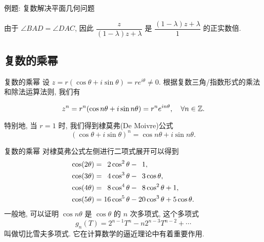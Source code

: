 \begin{frame}{例题: 复数解决平面几何问题}
	\onslide<+->
	\begin{proofc}
		由于 $\angle BAD=\angle DAC$, 因此 $\dfrac{z}{(1-\lambda)z+\lambda}$ 是 $\dfrac{(1-\lambda)z+\lambda}{1}$ 的正实数倍.
		\onslide<+->{
			显然 $z\neq \ov z$. 又因为 $0<\lambda<1$, 故
			\[\frac{AB}{AC}=|z|=\frac{\lambda}{1-\lambda}
			=\frac{DB}{BC-DB}=\frac{DB}{DC}.\qedhere\]
		}
		\vspace{-\baselineskip}
	\end{proofc}
\end{frame}



\subsection{复数的乘幂}

\begin{frame}{复数的乘幂}
	\onslide<+->
	设 $z=r(\cos\theta+i\sin\theta)=re^{i\theta}\neq0$.
	\onslide<+->
	根据复数三角/指数形式的乘法和除法运算法则, 我们有
	\onslide<+->
	\begin{alertblock@}
		\[z^n=r^n(\cos{n\theta}+i\sin{n\theta})=r^ne^{in\theta},\quad\forall n\in{\mathbb{Z}}.\]
	\end{alertblock@}
	\onslide<+->
	特别地, 当 $r=1$ 时, 我们得到棣莫弗(De Moivre)公式
	\[(\cos\theta+i\sin\theta)^n=\cos{n\theta}+i\sin{n\theta}.\]
\end{frame}


\begin{frame}{复数的乘幂\noexer}
	\onslide<+->
	对棣莫弗公式左侧进行二项式展开可以得到
	\onslide<+->
	\begin{align*}
		\cos(2\theta)&=\hphantom{1}2\cos^2\theta-\hphantom{1}1,\\
		\cos(3\theta)&=\hphantom{1}4\cos^3\theta-\hphantom{1}3\cos\theta,\\
		\cos(4\theta)&=\hphantom{1}8\cos^4\theta-\hphantom{1}8\cos^2\theta+1,\\
		\cos(5\theta)&=16\cos^5\theta-20\cos^3\theta+5\cos\theta.
	\end{align*}
	\onslide<+->
	一般地, 可以证明 $\cos{n\theta}$ 是 $\cos\theta$ 的 $n$ 次多项式,
	\onslide<+->
	这个多项式
	\[g_n(T)=2^{n-1}T^n-n2^{n-3}T^{n-2}+\cdots\]
	叫做切比雪夫多项式.
	\onslide<+->
	它在计算数学的逼近理论中有着重要作用.
\end{frame}


